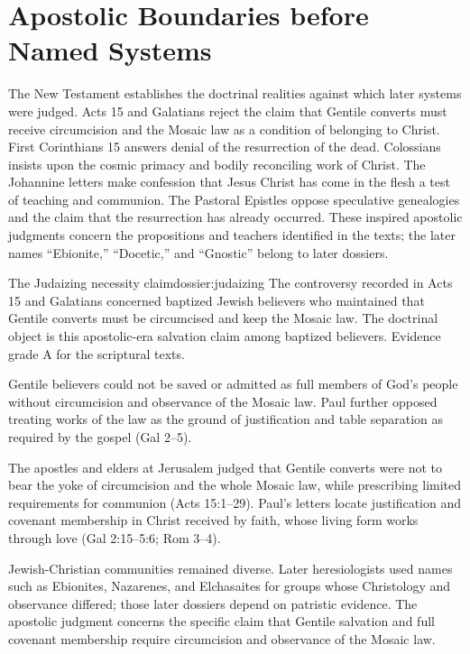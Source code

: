 \section{Apostolic Boundaries before Named Systems}

The New Testament establishes the doctrinal realities against which later systems were judged. Acts 15 and Galatians reject the claim that Gentile converts must receive circumcision and the Mosaic law as a condition of belonging to Christ. First Corinthians 15 answers denial of the resurrection of the dead. Colossians insists upon the cosmic primacy and bodily reconciling work of Christ. The Johannine letters make confession that Jesus Christ has come in the flesh a test of teaching and communion. The Pastoral Epistles oppose speculative genealogies and the claim that the resurrection has already occurred. These inspired apostolic judgments concern the propositions and teachers identified in the texts; the later names ``Ebionite,'' ``Docetic,'' and ``Gnostic'' belong to later dossiers.

\begin{heresydossier}{The Judaizing necessity claim}{dossier:judaizing}
\objectfield The controversy recorded in Acts 15 and Galatians concerned baptized Jewish believers who maintained that Gentile converts must be circumcised and keep the Mosaic law. The doctrinal object is this apostolic-era salvation claim among baptized believers. Evidence grade A for the scriptural texts.

\propositionfield Gentile believers could not be saved or admitted as full members of God's people without circumcision and observance of the Mosaic law. Paul further opposed treating works of the law as the ground of justification and table separation as required by the gospel (Gal 2--5).

\responsefield The apostles and elders at Jerusalem judged that Gentile converts were not to bear the yoke of circumcision and the whole Mosaic law, while prescribing limited requirements for communion (Acts 15:1--29). Paul's letters locate justification and covenant membership in Christ received by faith, whose living form works through love (Gal 2:15--5:6; Rom 3--4).

\aftermathfield Jewish-Christian communities remained diverse. Later heresiologists used names such as Ebionites, Nazarenes, and Elchasaites for groups whose Christology and observance differed; those later dossiers depend on patristic evidence. The apostolic judgment concerns the specific claim that Gentile salvation and full covenant membership require circumcision and observance of the Mosaic law.
\end{heresydossier}

